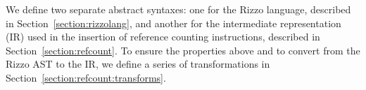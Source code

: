 We define two separate abstract syntaxes: one for the Rizzo language, described in Section~\ref{section:rizzolang}, and another for the intermediate representation (IR) used in the insertion of reference counting instructions, described in Section~\ref{section:refcount}.
To ensure the properties above and to convert from the Rizzo AST to the IR, we define a series of transformations in Section~\ref{section:refcount:transforms}.
